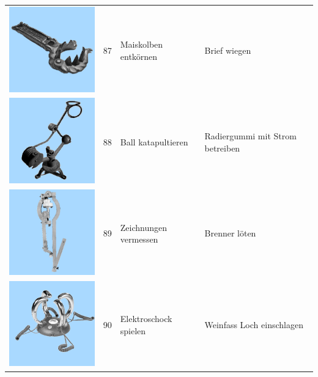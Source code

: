 \documentclass[
  english,
  man,floatsintext]{apa7}
\begin{document}
\begin{center}
\begin{ThreePartTable}
\begin{longtable}{llll}
\includegraphics[valign=c, scale=0.19]{../materials/unfamiliar/87.png} & 87 & Maiskolben entkörnen & Brief wiegen\\
\includegraphics[valign=c, scale=0.19]{../materials/unfamiliar/88.png} & 88 & Ball katapultieren & Radiergummi mit Strom betreiben\\
\includegraphics[valign=c, scale=0.19]{../materials/unfamiliar/89.png} & 89 & Zeichnungen vermessen & Brenner löten\\
\includegraphics[valign=c, scale=0.19]{../materials/unfamiliar/90.png} & 90 & Elektroschock spielen & Weinfass Loch einschlagen\\

\end{longtable}
\end{ThreePartTable}
\end{center}
\end{document}
